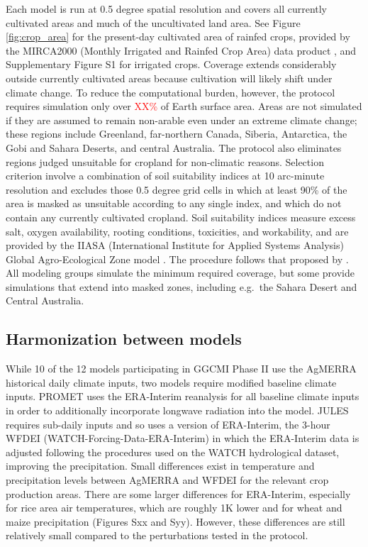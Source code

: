 \documentclass[gmd, manuscript]{copernicus} %
\begin{document}
Each model is run at 0.5 degree spatial resolution and covers all currently cultivated areas and much of the uncultivated land area. See Figure \ref{fig:crop_area} for the present-day cultivated area of rainfed crops, provided by the MIRCA2000 (Monthly Irrigated and Rainfed Crop Area) data product \citep{Portmann2010}, and Supplementary Figure S1 for irrigated crops. 
Coverage extends considerably outside currently cultivated areas because cultivation will likely shift under climate change.  
To reduce the computational burden, however, the protocol requires simulation only over \textcolor{red}{XX\%} of Earth surface area.  
Areas are not simulated if they are assumed to remain non-arable even under an extreme climate change; these regions include Greenland, far-northern Canada, Siberia, Antarctica, the Gobi and Sahara Deserts, and central Australia. 
The protocol also eliminates regions judged unsuitable for cropland for non-climatic reasons. 
Selection criterion involve a combination of soil suitability indices at 10 arc-minute resolution and excludes those 0.5 degree grid cells in which at least 90\% of the area is masked as unsuitable according to any single index, and which do not contain any currently cultivated cropland. 
Soil suitability indices measure excess salt, oxygen availability, rooting conditions, toxicities, and workability, and are provided by the IIASA (International Institute for Applied Systems Analysis) Global Agro-Ecological Zone model \citep[GAEZ, ][]{gaez}. 
The procedure follows that proposed by \citet{pugh_climate_2016}. 
All modeling groups simulate the minimum required coverage, but some provide simulations that extend into masked zones, including e.g.\ the Sahara Desert and Central Australia.

\subsection{Harmonization between models}

While 10 of the 12 models participating in GGCMI Phase II use the AgMERRA historical daily climate inputs, two models require modified baseline climate inputs.
PROMET uses the ERA-Interim reanalysis for all baseline climate inputs \citep{dee2011era} in order to additionally incorporate longwave radiation into the model. JULES requires sub-daily inputs and so uses a version of ERA-Interim, the 3-hour WFDEI (WATCH-Forcing-Data-ERA-Interim) \citep{weedon2014wfdei} in which the ERA-Interim data is adjusted following the procedures used on the WATCH hydrological dataset, improving the precipitation.
Small differences exist in temperature and precipitation levels between AgMERRA and WFDEI for the relevant crop production areas.
There are some larger differences for ERA-Interim, especially for rice area air temperatures, which are roughly 1K lower and for wheat and maize precipitation (Figures Sxx and Syy).
However, these differences are still relatively small compared to the perturbations tested in the protocol.
\end{document}
